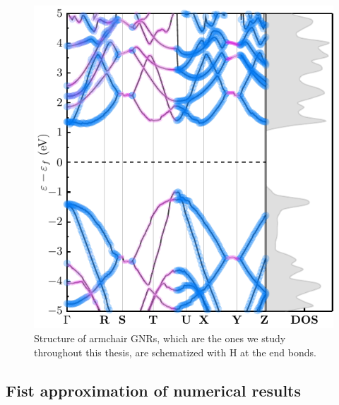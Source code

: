\begin{figure}[h!]
	\centering
	\includegraphics[width=0.80\linewidth]{FIGURES/Physical_Background/PLOT-GNRS008}
	\caption{Structure of armchair GNRs, which are the ones we study throughout this thesis, are schematized with H at the end bonds. }
	\label{fig:introfig32}
\end{figure}




\subsection{Fist approximation of numerical results}
\vspace{-1cm}


